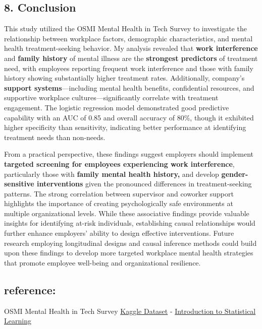 \documentclass[
]{article}
\begin{document}
\subsection{8. Conclusion}\label{conclusion}

This study utilized the OSMI Mental Health in Tech Survey to investigate
the relationship between workplace factors, demographic characteristics,
and mental health treatment-seeking behavior. My analysis revealed that
\textbf{work interference} and \textbf{family history} of mental illness
are the \textbf{strongest predictors} of treatment need, with employees
reporting frequent work interference and those with family history
showing substantially higher treatment rates. Additionally, company's
\textbf{support systems}---including mental health benefits,
confidential resources, and supportive workplace
cultures---significantly correlate with treatment engagement. The
logistic regression model demonstrated good predictive capability with
an AUC of 0.85 and overall accuracy of 80\%, though it exhibited higher
specificity than sensitivity, indicating better performance at
identifying treatment needs than non-needs.

From a practical perspective, these findings suggest employers should
implement \textbf{targeted screening for employees experiencing work
interference}, particularly those with \textbf{family mental health
history,} and develop \textbf{gender-sensitive interventions} given the
pronounced differences in treatment-seeking patterns. The strong
correlation between supervisor and coworker support highlights the
importance of creating psychologically safe environments at multiple
organizational levels. While these associative findings provide valuable
insights for identifying at-risk individuals, establishing causal
relationships would further enhance employers' ability to design
effective interventions. Future research employing longitudinal designs
and causal inference methods could build upon these findings to develop
more targeted workplace mental health strategies that promote employee
well-being and organizational resilience.

\subsection{reference:}\label{reference}

OSMI Mental Health in Tech Survey
\href{https://www.kaggle.com/datasets/osmi/mental-health-in-tech-survey/data}{Kaggle
Dataset} - \href{https://www.statlearning.com/}{Introduction to
Statistical Learning}
\end{document}
